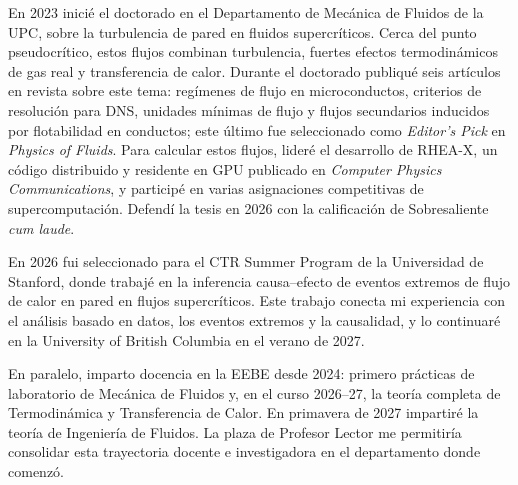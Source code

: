 \documentclass[11pt]{article}
\begin{document}
En 2023 inici\'e el doctorado en el Departamento de Mec\'anica de Fluidos de la UPC, sobre
la turbulencia de pared en fluidos supercr\'iticos. Cerca del punto pseudocr\'itico, estos
flujos combinan turbulencia, fuertes efectos termodin\'amicos de gas real y transferencia
de calor. Durante el doctorado publiqu\'e seis art\'iculos en revista sobre este tema: reg\'imenes
de flujo en microconductos, criterios de resoluci\'on para DNS, unidades m\'inimas de flujo y
flujos secundarios inducidos por flotabilidad en conductos; este \'ultimo fue seleccionado
como \emph{Editor's Pick} en \emph{Physics of Fluids}. Para calcular estos flujos, lider\'e el
desarrollo de RHEA-X, un c\'odigo distribuido y residente en GPU publicado en
\emph{Computer Physics Communications}, y particip\'e en varias asignaciones competitivas de
supercomputaci\'on. Defend\'i la tesis en 2026 con la calificaci\'on de Sobresaliente
\emph{cum laude}.

En 2026 fui seleccionado para el CTR Summer Program de la Universidad de Stanford, donde
trabaj\'e en la inferencia causa--efecto de eventos extremos de flujo de calor en pared en
flujos supercr\'iticos. Este trabajo conecta mi experiencia con el an\'alisis basado en
datos, los eventos extremos y la causalidad, y lo continuar\'e en la University of British
Columbia en el verano de 2027.

En paralelo, imparto docencia en la EEBE desde 2024: primero pr\'acticas de laboratorio de
Mec\'anica de Fluidos y, en el curso 2026--27, la teor\'ia completa de Termodin\'amica y
Transferencia de Calor. En primavera de 2027 impartir\'e la teor\'ia de Ingenier\'ia de
Fluidos. La plaza de Profesor Lector me permitir\'ia consolidar esta trayectoria docente e
investigadora en el departamento donde comenz\'o.

\end{document}
